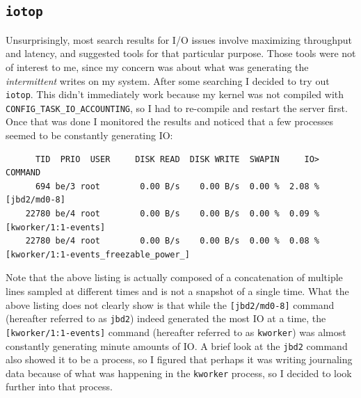 \documentclass{article}
\begin{document}
\subsection{\texttt{iotop}}
Unsurprisingly, most search results for I/O issues involve maximizing throughput and latency, and suggested tools for that particular purpose.  Those tools were not of interest to me, since my concern was about what was generating the \emph{intermittent} writes on my system.  After some searching I decided to try out \texttt{iotop}.  This didn't immediately work because my kernel was not compiled with \texttt{CONFIG_TASK_IO_ACCOUNTING}, so I had to re-compile and restart the server first.  Once that was done I monitored the results and noticed that a few processes seemed to be constantly generating IO:
\begin{verbatim}
	  TID  PRIO  USER     DISK READ  DISK WRITE  SWAPIN     IO>    COMMAND
	  694 be/3 root        0.00 B/s    0.00 B/s  0.00 %  2.08 % [jbd2/md0-8]
	22780 be/4 root        0.00 B/s    0.00 B/s  0.00 %  0.09 % [kworker/1:1-events]
	22780 be/4 root        0.00 B/s    0.00 B/s  0.00 %  0.08 % [kworker/1:1-events_freezable_power_]
\end{verbatim}
Note that the above listing is actually composed of a concatenation of multiple lines sampled at different times and is not a snapshot of a single time.  What the above listing does not clearly show is that while the \verb|[jbd2/md0-8]| command (hereafter referred to as \texttt{jbd2}) indeed generated the most IO at a time, the \verb|[kworker/1:1-events]| command (hereafter referred to as \texttt{kworker}) was almost constantly generating minute amounts of IO.  A brief look at the \texttt{jbd2} command also showed it to be a  process, so I figured that perhaps it was writing journaling data because of what was happening in the \texttt{kworker} process, so I decided to look further into that process.
\end{document}
